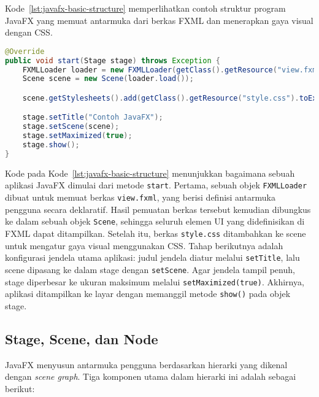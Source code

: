 Kode~\ref{lst:javafx-basic-structure} memperlihatkan contoh struktur program JavaFX yang memuat antarmuka dari berkas FXML dan menerapkan gaya visual dengan CSS.

\begin{lstlisting}[language=Java, caption=Struktur dasar aplikasi JavaFX, label=lst:javafx-basic-structure]
@Override
public void start(Stage stage) throws Exception {
    FXMLLoader loader = new FXMLLoader(getClass().getResource("view.fxml"));
    Scene scene = new Scene(loader.load());

    scene.getStylesheets().add(getClass().getResource("style.css").toExternalForm());

    stage.setTitle("Contoh JavaFX");
    stage.setScene(scene);
    stage.setMaximized(true);
    stage.show();
}
\end{lstlisting}

Kode pada Kode~\ref{lst:javafx-basic-structure} menunjukkan bagaimana sebuah aplikasi JavaFX dimulai dari metode \texttt{start}. Pertama, sebuah objek \texttt{FXMLLoader} dibuat untuk memuat berkas \texttt{view.fxml}, yang berisi definisi antarmuka pengguna secara deklaratif. Hasil pemuatan berkas tersebut kemudian dibungkus ke dalam sebuah objek \texttt{Scene}, sehingga seluruh elemen UI yang didefinisikan di FXML dapat ditampilkan. Setelah itu, berkas \texttt{style.css} ditambahkan ke scene untuk mengatur gaya visual menggunakan CSS. Tahap berikutnya adalah konfigurasi jendela utama aplikasi: judul jendela diatur melalui \texttt{setTitle}, lalu scene dipasang ke dalam stage dengan \texttt{setScene}. Agar jendela tampil penuh, stage diperbesar ke ukuran maksimum melalui \texttt{setMaximized(true)}. Akhirnya, aplikasi ditampilkan ke layar dengan memanggil metode \texttt{show()} pada objek stage.


\subsection{Stage, Scene, dan Node}
JavaFX menyusun antarmuka pengguna berdasarkan hierarki yang dikenal dengan \textit{scene graph}. Tiga komponen utama dalam hierarki ini adalah sebagai berikut:


